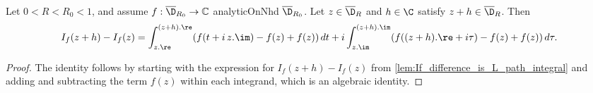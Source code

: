 \begin{lemma}\label{lem:If_diff_add_sub_identity}
\leanok
Let $0<R<R_0<1$, and assume $f:\overline{\D}_{R_0}\to\mathbb{C}$ analyticOnNhd $\overline{\D}_{R_0}$. Let $z \in \overline{\D}_R$ and $h\in\C$ satisfy $z+h \in \overline{\D}_R$. Then
\[ I_f(z+h)-I_f(z) = \int_{z.\re}^{(z+h).\re} (f(t + i\,z.\im) - f(z) + f(z))\,dt + i \int_{z.\im}^{(z+h).\im} (f((z+h).\re + i\tau) - f(z) + f(z))\,d\tau. \]
\end{lemma}
\begin{proof}
\leanok
{}
The identity follows by starting with the expression for $I_f(z+h)-I_f(z)$ from \cref{lem:If_difference_is_L_path_integral} and adding and subtracting the term $f(z)$ within each integrand, which is an algebraic identity.
\end{proof}

